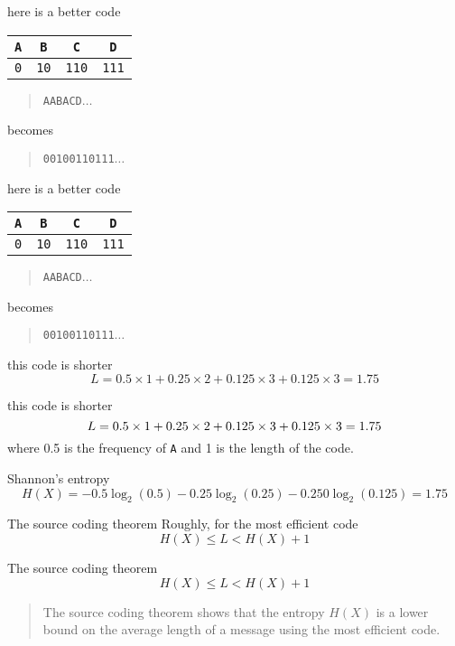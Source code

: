 \documentclass{beamer}
\newcommand{\crish}{\color{reddish}}
\newcommand{\cbla}{\color{black}}
\newcommand{\cred}{\color{red}}
\newcommand{\cblu}{\color{blue}}
\newcommand{\cgre}{\color{green}}
\newcommand{\letter}[1]{\color{blue}\texttt{#1}\color{black}}
\newcommand{\binary}[1]{\color{red}\texttt{#1}\color{black}}
\begin{document}
\begin{frame}{here is a better code}
\begin{center}
\begin{tabular}{cccc}
\letter{A}&\letter{B}&\letter{C}&\letter{D}\\
\hline
\binary{0}&\binary{10}&\binary{110}&\binary{111}
\end{tabular}
\end{center}
  \begin{quote}
    \letter{AABA\cgre C\cblu{}D}$\ldots$
  \end{quote}
  becomes
    \begin{quote}
    \binary{00100\cgre 110\cred{}111}$\ldots$
    \end{quote}
\end{frame}  


\begin{frame}{here is a better code}
\begin{center}
\begin{tabular}{cccc}
\letter{A}&\letter{B}&\letter{C}&\letter{D}\\
\hline
\binary{0}&\binary{10}&\binary{110}&\binary{111}
\end{tabular}
\end{center}
  \begin{quote}
    \letter{AABAC\cgre D\cblu{}}$\ldots$
  \end{quote}
  becomes
    \begin{quote}
    \binary{00100110\cgre 111\cred{}}$\ldots$
    \end{quote}
\end{frame}  

\begin{frame}{this code is shorter}
  \crish
  $$
  L=0.5\times 1 +0.25\times 2 + 0.125\times 3 +
0.125\times 3=1.75
$$
\cbla
\end{frame}


\begin{frame}{this code is shorter}
  \crish
  $$
  L=\cgre 0.5\cbla \times \cred 1\crish +0.25\times 2 + 0.125\times 3 +
0.125\times 3=1.75
$$
\cbla
where \cgre 0.5\cbla{} is the frequency of \letter{A}{} and \cred 1\cbla{} is the length of the code.
\end{frame}


\begin{frame}{Shannon's entropy}
  \crish
  $$
H(X)=-0.5\log_2(0.5)-0.25\log_2(0.25)-0.250\log_2(0.125)=1.75
$$
\cbla
\end{frame}

\begin{frame}{The source coding theorem}
Roughly, for the most efficient code
  \crish
  $$
H(X)\le L < H(X)+1
$$
\cbla
\end{frame}


\begin{frame}{The source coding theorem}
  \crish
  $$
H(X)\le L < H(X)+1
$$
\cbla
\begin{quote}
  The source coding theorem shows that the entropy $H(X)$ is a lower
  bound on the average length of a message using the most efficient
  code.
\end{quote}
\end{frame}
\end{document}
